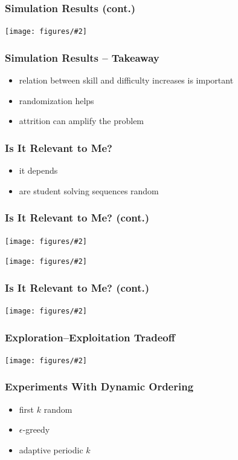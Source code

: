 \documentclass[bigger]{beamer}
\newcommand{\img}[2]{
  \begin{center}
    \texttt{[image: figures/\#2]}
  \end{center}
}
\begin{document}
\begin{frame}
  \frametitle{Simulation Results (cont.)}

  \img{.9}{problem-ordering-bias}
\end{frame}

\begin{frame}
  \frametitle{Simulation Results -- Takeaway}

  \begin{itemize}
  \item relation between skill and difficulty increases is important
  \item randomization helps
  \item attrition can amplify the problem
  \end{itemize}
\end{frame}

\begin{frame}
  \frametitle{Is It Relevant to Me?}
  \begin{itemize}
      \item it depends
      \item are student solving sequences random
  \end{itemize}
\end{frame}

\begin{frame}
\frametitle{Is It Relevant to Me? (cont.)}
\img{.8}{ordering-analysis-robomission}

\img{.8}{ordering-analysis-marble}
\end{frame}

\begin{frame}
\frametitle{Is It Relevant to Me? (cont.)}
  \img{1}{ordering-analysis-comparison-all}
\end{frame}

\begin{frame}
\frametitle{Exploration–Exploitation Tradeoff}
\img{.9}{explore-exploit}
\end{frame}

\begin{frame}
  \frametitle{Experiments With Dynamic Ordering}
  \begin{itemize}
      \item first $k$ random
      \item $\epsilon$-greedy
      \item adaptive periodic $k$
  \end{itemize}
\end{frame}
\end{document}
